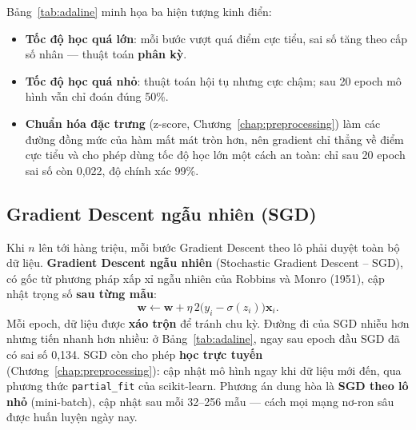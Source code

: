 Bảng~\ref{tab:adaline} minh họa ba hiện tượng kinh điển:
\begin{itemize}
    \item \textbf{Tốc độ học quá lớn}: mỗi bước vượt quá điểm cực tiểu, sai số tăng theo cấp số nhân --- thuật toán \textbf{phân kỳ}.
    \item \textbf{Tốc độ học quá nhỏ}: thuật toán hội tụ nhưng cực chậm; sau 20 epoch mô hình vẫn chỉ đoán đúng 50\%.
    \item \textbf{Chuẩn hóa đặc trưng} (z-score, Chương~\ref{chap:preprocessing}) làm các đường đồng mức của hàm mất mát tròn hơn, nên gradient chỉ thẳng về điểm cực tiểu và cho phép dùng tốc độ học lớn một cách an toàn: chỉ sau 20 epoch sai số còn 0,022, độ chính xác 99\%.
\end{itemize}


\subsection{Gradient Descent ngẫu nhiên (SGD)}

Khi $n$ lên tới hàng triệu, mỗi bước Gradient Descent theo lô phải duyệt toàn bộ dữ liệu. \textbf{Gradient Descent ngẫu nhiên} (Stochastic Gradient Descent -- SGD), có gốc từ phương pháp xấp xỉ ngẫu nhiên của Robbins và Monro (1951), cập nhật trọng số \textbf{sau từng mẫu}:
\begin{equation}
    \mathbf{w} \leftarrow \mathbf{w} + \eta\,2\big(y_i - \sigma(z_i)\big)\mathbf{x}_i .
\end{equation}
Mỗi epoch, dữ liệu được \textbf{xáo trộn} để tránh chu kỳ. Đường đi của SGD nhiễu hơn nhưng tiến nhanh hơn nhiều: ở Bảng~\ref{tab:adaline}, ngay sau epoch đầu SGD đã có sai số 0,134. SGD còn cho phép \textbf{học trực tuyến} (Chương~\ref{chap:preprocessing}): cập nhật mô hình ngay khi dữ liệu mới đến, qua phương thức \texttt{partial\_fit} của scikit-learn. Phương án dung hòa là \textbf{SGD theo lô nhỏ} (mini-batch), cập nhật sau mỗi 32--256 mẫu --- cách mọi mạng nơ-ron sâu được huấn luyện ngày nay.

